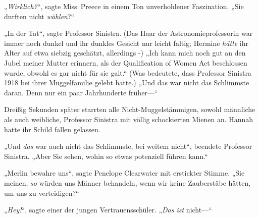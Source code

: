 „\emph{Wirklich?}“, sagte Miss~Preece in einem Ton unverhohlener Faszination. „Sie durften nicht \emph{wählen}?“

„In der Tat“, sagte Professor Sinistra. (Das Haar der Astronomieprofessorin war immer noch dunkel und ihr dunkles Gesicht nur leicht faltig; Hermine \emph{hätte} ihr Alter auf etwa siebzig geschätzt, allerdings -) „Ich kann mich noch gut an den Jubel meiner Mutter erinnern, als der Qualification of Women Act beschlossen wurde, obwohl es gar nicht für sie galt.“ (Was bedeutete, dass Professor Sinistra 1918 bei ihrer Muggelfamilie gelebt hatte.) „Und das war nicht das Schlimmste daran. Denn nur ein paar Jahrhunderte früher—“

Dreißig Sekunden später starrten alle Nicht-Muggelstämmigen, sowohl männliche als auch weibliche, Professor Sinistra mit völlig schockierten Mienen an. Hannah hatte ihr Schild fallen gelassen.

„Und \emph{das} war auch nicht das Schlimmste, bei weitem nicht“, beendete Professor Sinistra. „Aber Sie sehen, wohin so etwas potenziell führen kann.“

„Merlin bewahre uns“, sagte Penelope Clearwater mit erstickter Stimme. „Sie meinen, \emph{so} würden uns Männer behandeln, wenn wir keine Zauberstäbe hätten, um uns zu verteidigen?“

„\emph{Hey!}“, sagte einer der jungen Vertrauensschüler. „\emph{Das ist} nicht—“

